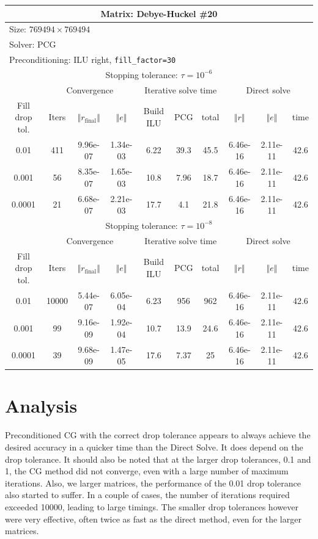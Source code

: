 \documentclass[oneside,final]{amsart}  %
\begin{document}
\begin{tabular}{|c|c|c|c|c|c|c|c|c|c|}
\hline
\multicolumn{10}{|c|}{Matrix: Debye-Huckel \#20}\tabularnewline
\hline
  \multicolumn{10}{|l|}{Size: $769494\times769494$}\tabularnewline
\hline
\multicolumn{10}{|l|}{Solver: PCG}\tabularnewline
\hline
\multicolumn{10}{|l|}{Preconditioning: ILU right, \texttt{fill\_factor=30}}\tabularnewline
\hline
\hline
\multicolumn{10}{|c|}{Stopping tolerance: $\tau=10^{-6}$}\tabularnewline
\hline
\hline
 & \multicolumn{3}{c|}{Convergence} & \multicolumn{3}{c|}{Iterative solve time} & \multicolumn{3}{c|}{Direct solve}\tabularnewline
\hline
Fill drop tol.  & Iters & $\left\Vert r_{\text{final}}\right\Vert $  & $\left\Vert e\right\Vert $  & Build ILU  & PCG  & total  & $\left\Vert r\right\Vert $ & $\left\Vert e\right\Vert $  & time\tabularnewline
\hline
  0.01 & 411 & 9.96e-07 & 1.34e-03 &       6.22 &       39.3 &       45.5 & 6.46e-16 & 2.11e-11 &       42.6\\
  \hline
  0.001 & 56 & 8.35e-07 & 1.65e-03 &       10.8 &       7.96 &       18.7 & 6.46e-16 & 2.11e-11 &       42.6\\
  \hline
  0.0001 & 21 & 6.68e-07 & 2.21e-03 &       17.7 &        4.1 &       21.8 & 6.46e-16 & 2.11e-11 &       42.6\\
  \hline
\hline
\multicolumn{10}{|c|}{Stopping tolerance: $\tau=10^{-8}$}\tabularnewline
\hline
\hline
 & \multicolumn{3}{c|}{Convergence} & \multicolumn{3}{c|}{Iterative solve time} & \multicolumn{3}{c|}{Direct solve }\tabularnewline
\hline
Fill drop tol.  & Iters  & $\left\Vert r_{\text{final}}\right\Vert $  & $\left\Vert e\right\Vert $ & Build ILU  & PCG  & total  & $\left\Vert r\right\Vert $  & $\left\Vert e\right\Vert $  & time\tabularnewline
\hline
  0.01 & 10000 & 5.44e-07 & 6.05e-04 &       6.23 &        956 &        962 & 6.46e-16 & 2.11e-11 &       42.6\\
  \hline
  0.001 & 99 & 9.16e-09 & 1.92e-04 &       10.7 &       13.9 &       24.6 & 6.46e-16 & 2.11e-11 &       42.6\\
  \hline
  0.0001 & 39 & 9.68e-09 & 1.47e-05 &       17.6 &       7.37 &         25 & 6.46e-16 & 2.11e-11 &       42.6\\
  \hline
\end{tabular}

\section{Analysis}
Preconditioned CG with the correct drop tolerance appears to always achieve the desired accuracy in
a quicker time than the Direct Solve. It does depend on the drop tolerance. It should also be noted
that at the larger drop tolerances, 0.1 and 1, the CG method did not converge, even with a large
number of maximum iterations.  Also, we larger matrices, the performance of the 0.01 drop tolerance
also started to suffer.  In a couple of cases, the number of iterations required exceeded 10000,
leading to large timings.  The smaller drop tolerances however were very effective, often twice as
fast as the direct method, even for the larger matrices.
\end{document}

